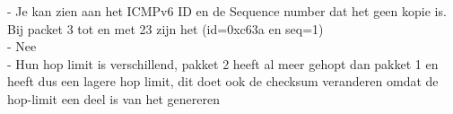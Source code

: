 - Je kan zien aan het ICMPv6 ID en de Sequence number dat het geen kopie is. Bij packet 3 tot en met 23 zijn het (id=0xc63a en seq=1)\\

- Nee\\

- Hun hop limit is verschillend, pakket 2 heeft al meer gehopt dan pakket 1 en heeft dus een lagere hop limit, dit doet ook de checksum veranderen omdat de hop-limit een deel is van het genereren